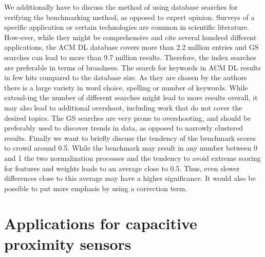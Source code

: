 We additionally have to discuss the method of using database searches for verifying the benchmarking method, as opposed to expert opinion. Surveys of a specific application or certain technologies are common in scientific literature. How-ever, while they might be comprehensive and cite several hundred different applications, the ACM DL database covers more than 2.2 million entries and GS searches can lead to more than 9.7 million results. Therefore, the index searches are preferable in terms of broadness. The search for keywords in ACM DL results in few hits compared to the database size. As they are chosen by the authors there is a large variety in word choice, spelling or number of keywords. While extend-ing the number of different searches might lead to more results overall, it may also lead to additional overshoot, including work that do not cover the desired topics. The GS searches are very prone to overshooting, and should be preferably used to discover trends in data, as opposed to narrowly clustered results.
Finally we want to briefly discuss the tendency of the benchmark scores to crowd around 0.5. While the benchmark may result in any number between 0 and 1 the two normalization processes and the tendency to avoid extreme scoring for features and weights leads to an average close to 0.5. Thus, even slower differences close to this average may have a higher significance. It would also be possible to put more emphasis by using a correction term.

\section{Applications for capacitive proximity sensors}
